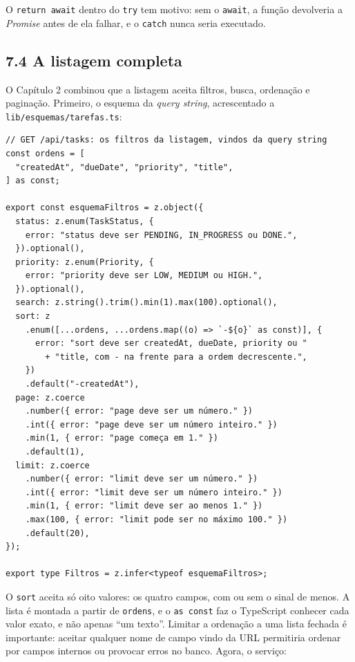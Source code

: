 O \texttt{return await} dentro do \texttt{try} tem motivo: sem o \texttt{await}, a função devolveria a \textit{Promise} antes de ela falhar, e o \texttt{catch} nunca seria executado.

\subsection{7.4 A listagem completa}

O Capítulo 2 combinou que a listagem aceita filtros, busca, ordenação e paginação. Primeiro, o esquema da \textit{query string}, acrescentado a \texttt{lib/esquemas/tarefas.ts}:

\begin{codigo}
\begin{Verbatim}[breaklines=true, breaksymbolleft={}, fontsize=\footnotesize]
// GET /api/tasks: os filtros da listagem, vindos da query string
const ordens = [
  "createdAt", "dueDate", "priority", "title",
] as const;

export const esquemaFiltros = z.object({
  status: z.enum(TaskStatus, {
    error: "status deve ser PENDING, IN_PROGRESS ou DONE.",
  }).optional(),
  priority: z.enum(Priority, {
    error: "priority deve ser LOW, MEDIUM ou HIGH.",
  }).optional(),
  search: z.string().trim().min(1).max(100).optional(),
  sort: z
    .enum([...ordens, ...ordens.map((o) => `-${o}` as const)], {
      error: "sort deve ser createdAt, dueDate, priority ou "
        + "title, com - na frente para a ordem decrescente.",
    })
    .default("-createdAt"),
  page: z.coerce
    .number({ error: "page deve ser um número." })
    .int({ error: "page deve ser um número inteiro." })
    .min(1, { error: "page começa em 1." })
    .default(1),
  limit: z.coerce
    .number({ error: "limit deve ser um número." })
    .int({ error: "limit deve ser um número inteiro." })
    .min(1, { error: "limit deve ser ao menos 1." })
    .max(100, { error: "limit pode ser no máximo 100." })
    .default(20),
});

export type Filtros = z.infer<typeof esquemaFiltros>;
\end{Verbatim}
\end{codigo}

O \texttt{sort} aceita só oito valores: os quatro campos, com ou sem o sinal de menos. A lista é montada a partir de \texttt{ordens}, e o \texttt{as const} faz o TypeScript conhecer cada valor exato, e não apenas ``um texto''. Limitar a ordenação a uma lista fechada é importante: aceitar qualquer nome de campo vindo da URL permitiria ordenar por campos internos ou provocar erros no banco. Agora, o serviço:

